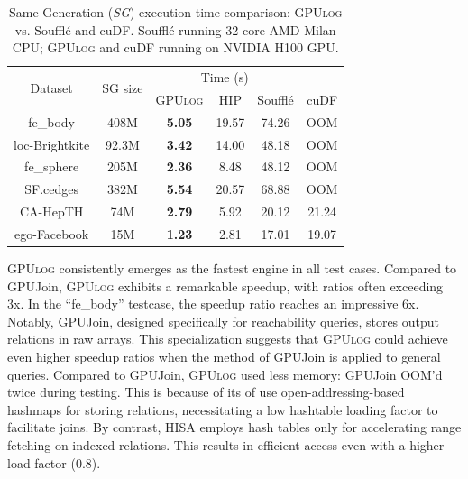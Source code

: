 \documentclass[nonacm,sigplan]{acmart}
\newcommand{\tool}{\textsc{GPUlog}}
\newcommand{\revised}[1]{{#1}}
\begin{document}
\begin{table}[t]
    \fontsize{9}{11}\selectfont
    \caption{\fontsize{9}{11}\selectfont Same Generation (\emph{SG}) execution time comparison: \tool{} vs. Souffl\'e  and cuDF. Souffl\'e running \revised{32 core AMD Milan CPU}; \tool{} and cuDF running on NVIDIA H100 GPU.}   
    \begin{tabular}{c||c||c|c|c|c}
    \toprule
    \multicolumn{1}{c}{\multirow{2}{*}{Dataset}} & \multicolumn{1}{c}{\multirow{2}{*}{SG size}} & \multicolumn{3}{c}{Time (s)} \\ 
    \multicolumn{1}{c}{}                         & \multicolumn{1}{c}{}                         & \tool{} & HIP      & Souffl\'e     & cuDF    \\ \midrule
    fe\_body                                     & 408M                                  & \textbf{5.05} & 19.57     & 74.26       & OOM    \\
    loc-Brightkite                               & 92.3M                                  & \textbf{3.42} & 14.00      & 48.18       & OOM        \\
    fe\_sphere                                   & 205M                                  & \textbf{2.36} & 8.48      & 48.12       & OOM        \\
    SF.cedges                                     & 382M                                   & \textbf{5.54} & 20.57      & 68.88       & OOM        \\
    CA-HepTH                                     & 74M                                   & \textbf{2.79} & 5.92      & 20.12       & 21.24        \\
    ego-Facebook  & 15M & \textbf{1.23} & 2.81 & 17.01 & 19.07 \\
    \bottomrule
    \end{tabular}
   \label{tab:sg_compare}
\end{table}

\tool{} consistently emerges as the fastest engine in all test cases. Compared to GPUJoin, \tool{} exhibits a remarkable speedup, with ratios often exceeding 3x. In the  ``fe\_body'' testcase, the speedup ratio reaches an impressive 6x. Notably, GPUJoin, designed specifically for reachability queries, stores output relations in raw arrays. This specialization suggests that \tool{} could achieve even higher speedup ratios when the method of GPUJoin is applied to general  queries.
Compared to GPUJoin, \tool{} used less memory: GPUJoin OOM'd twice during testing. This is because of its of use open-addressing-based hashmaps for storing relations, necessitating a low hashtable loading factor to facilitate joins.  By contrast, HISA employs hash tables only for accelerating range fetching on indexed relations. This results in efficient access even with a higher load factor ($0.8$).
\end{document}
